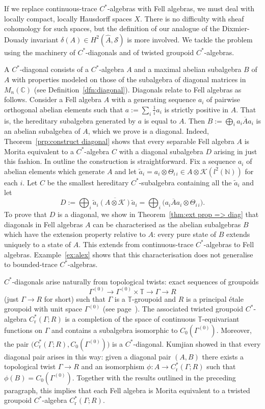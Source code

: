 \documentclass[12pt,a4paper]{amsart}
\newcommand{\field}[1]{\mathbb{#1}}
\newcommand{\CC}{\field{C}}
\newcommand{\NN}{\field{N}}
\newcommand{\TT}{\field{T}}
\newcommand{\Kk}{\mathcal{K}}
\newcommand{\red}{\operatorname{r}}
\newcommand{\Tgerms}{\mathcal{S}}
\newcommand{\tgcsa}[2]{\ensuremath{C^*_{\red}(#1 ; #2)}}
\begin{document}
If we replace continuous-trace $C^*$-algebras with Fell
algebras, we must deal with locally compact, locally Hausdorff
spaces $X$. There is no difficulty with sheaf cohomology for
such spaces, but the definition of our analogue of the
Dixmier-Douady invariant $\delta(A) \in H^2(\widehat{A},
\Tgerms)$ is more involved. We tackle the problem using the
machinery of $C^*$-diagonals and of twisted groupoid
$C^*$-algebras.

A $C^*$-diagonal consists of a $C^*$-algebra $A$ and a maximal
abelian subalgebra $B$ of $A$ with properties modeled on those
of the subalgebra of diagonal matrices in $M_n(\CC)$ (see
Definition~\ref{dfn:diagonal}). Diagonals relate to Fell
algebras as follows. Consider a Fell algebra $A$ with a
generating sequence $a_i$ of pairwise orthogonal abelian
elements such that $a := \sum_i \frac{1}{i}a_i$ is strictly
positive in $A$. That is, the hereditary subalgebra generated by
$a$ is equal to $A$. Then $B := \bigoplus_i \overline{ a_i A
a_i}$ is an abelian subalgebra of $A$, which we prove is a
diagonal. Indeed, Theorem~\ref{prp:construct diagonal} shows
that every separable Fell algebra $A$ is Morita equivalent to a
$C^*$-algebra $C$ with a diagonal subalgebra $D$ arising in just
this fashion. In outline the construction is straightforward.
Fix a sequence $a_i$ of abelian elements which generate $A$ and
let $\tilde{a}_i = a_i \otimes \Theta_{i\,i} \in A \otimes
\Kk(l^2(\NN))$ for each $i$. Let $C$ be the smallest hereditary
$C^*$-subalgebra containing all the $\tilde{a}_i$ and let
\[\textstyle
D := \bigoplus_i \overline{ \tilde{a}_i (A \otimes \Kk) \tilde{a}_i}
=  \bigoplus_i \big(\overline{ a_i A a_i} \otimes \Theta_{i\,i}\big).
\]
To prove that $D$ is a diagonal, we show in
Theorem~\ref{thm:ext prop => diag}  that diagonals in Fell
algebras $A$ can be characterised as the abelian subalgebras
$B$ which have the extension property relative to $A$: every
pure state of $B$ extends uniquely to a state of $A$. This
extends \cite[Theorem~2.2]{Kumjian1986} from continuous-trace
$C^*$-algebras to Fell algebras.
Example~\ref{ex:alex} shows that this characterisation does not
generalise to bounded-trace $C^*$-algebras.

$C^*$-diagonals arise naturally from topological twists: exact
sequences of groupoids
\[
\Gamma^{(0)} \to \Gamma^{(0)} \times \TT \to \Gamma \to R%
\]
(just $\Gamma \to R$ for short) such that $\Gamma$ is a
$\TT$-groupoid and $R$ is a principal \'etale groupoid with
unit space $\Gamma^{(0)}$ (see page~\pageref{defn twist}).  The
associated twisted groupoid $C^*$-algebra $\tgcsa{\Gamma}{R}$
is a completion of the space of continuous $\TT$-equivariant
functions on $\Gamma$ and contains a subalgebra isomorphic to
$C_0(\Gamma^{(0)})$. Moreover, the pair
$\big(\tgcsa{\Gamma}{R}, C_0(\Gamma^{(0)})\big)$ is a
$C^*$-diagonal. Kumjian showed in \cite{Kumjian1986} that every
diagonal pair arises in this way: given a diagonal pair $(A,B)$
there exists a topological twist $\Gamma\to R$ and an
isomorphism $\phi : A \to \tgcsa{\Gamma}{R}$ such that $\phi(B)
= C_0(\Gamma^{(0)})$. Together with the results outlined in the
preceding paragraph, this implies that each Fell algebra is
Morita equivalent to a twisted groupoid $C^*$-algebra
$\tgcsa{\Gamma}{R}$.
\end{document}
